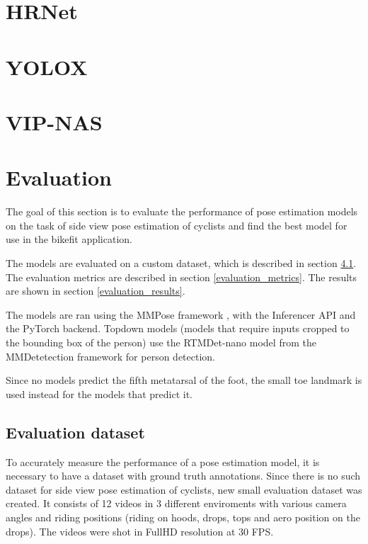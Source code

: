 \section{HRNet}

\section{YOLOX}

\section{VIP-NAS}

\section{Evaluation}
The goal of this section is to evaluate the performance of pose estimation models on the task of side view pose estimation of cyclists and find the best model for use in the bikefit application.

The models are evaluated on a custom dataset, which is described in section \ref{evaluation_dataset}. The evaluation metrics are described in section \ref{evaluation_metrics}. The results are shown in section \ref{evaluation_results}.

The models are ran using the MMPose framework \cite{mmpose2020}, with the Inferencer API and the PyTorch backend. Topdown models (models that require inputs cropped to the bounding box of the person) use the RTMDet-nano model \cite{rtmdet} from the MMDetetection framework \cite{mmdetection} for person detection.

Since no models predict the fifth metatarsal of the foot, the small toe landmark is used instead for the models that predict it.



\subsection{Evaluation dataset}
\label{evaluation_dataset}
To accurately measure the performance of a pose estimation model, it is necessary to have a dataset with ground truth annotations. Since there is no such dataset for side view pose estimation of cyclists, new small evaluation dataset was created. It consists of 12 videos in 3 different enviroments with various camera angles and riding positions (riding on hoods, drops, tops and aero position on the drops). The videos were shot in FullHD resolution at 30 FPS.

